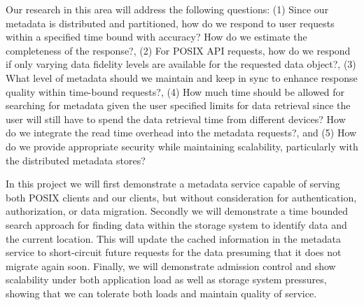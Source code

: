Our research in this area will address the following questions:
(1) Since our metadata is distributed and partitioned, how do we respond to user
  requests within a specified time bound with accuracy? How do we estimate the
  completeness of the response?, 
(2) For POSIX API requests, how do we respond if only varying data fidelity
  levels are available for the requested data object?, 
(3) What level of metadata should we maintain and keep in sync to enhance
  response quality within time-bound requests?, 
(4) How much time should be allowed for searching for metadata given the user
  specified limits for data retrieval since the user will still have to spend
  the data retrieval time from different devices? How do we integrate the read
  time overhead into the metadata requests?, and
(5) How do we provide appropriate security while maintaining scalability,
  particularly with the distributed metadata stores?

In this project we will first 
%
demonstrate a metadata service capable of serving both POSIX
clients and our clients, but without consideration for authentication,
authorization, or data migration.
Secondly we will 
demonstrate a time bounded search approach for finding data
within the storage system to identify data and the current location.  This will
update the cached information in the metadata service to short-circuit future
requests for the data presuming that it does not migrate again soon.
Finally, we will 
demonstrate admission control and show scalability under
both application load as well as storage system pressures, showing that we can
tolerate both loads and maintain quality of service.



